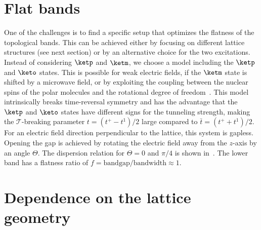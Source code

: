 \section{Flat bands}
One of the challenges is to find a specific setup that optimizes the flatness of the topological bands.
This can be achieved either by focusing on different lattice structures (see next section) or by an alternative choice for the two excitations.
Instead of considering $\ketp$ and $\ketm$, we choose a model including the $\ketp$ and $\keto$ states.
This is possible for weak electric fields, if the $\ketm$ state is shifted by a microwave field, or by exploiting the coupling between the nuclear spins of the polar molecules and the rotational degree of freedom~\cite{Ospelkaus2010,Yan2013}.
This model intrinsically breaks time-reversal symmetry and has the advantage that the $\ketp$ and $\keto$ states have different signs for the tunneling strength, making the $\mathcal{T}$-breaking parameter $t=(t^+-t^1)/2$ large compared to $\bar{t}=(t^++t^1)/2$. %
For an electric field direction perpendicular to the lattice, this system is gapless.
Opening the gap is achieved by rotating the electric field away from the $z$-axis by an angle $\Theta$.
The dispersion relation for $\Theta=0$ and $\pi/4$ is shown in~.
The lower band has a flatness ratio of $f = \text{bandgap}/\text{bandwidth} \approx 1$.



\section{Dependence on the lattice geometry}



